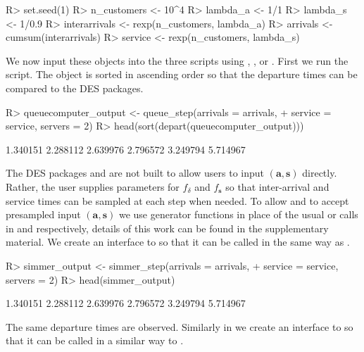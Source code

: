 \documentclass[article]{jss}
\begin{document}
\begin{Code}
R> set.seed(1)
R> n_customers <- 10^4
R> lambda_a <- 1/1
R> lambda_s <- 1/0.9
R> interarrivals <- rexp(n_customers, lambda_a)
R> arrivals <- cumsum(interarrivals)
R> service <- rexp(n_customers, lambda_s)
\end{Code}

We now input these objects into the three scripts using , , or . First we run the  script. The  object is sorted in ascending order so that the departure times can be compared to the DES packages.

\begin{CodeChunk}
\begin{CodeInput}
R> queuecomputer_output <- queue_step(arrivals = arrivals, 
+    service = service, servers = 2)
R> head(sort(depart(queuecomputer_output)))
\end{CodeInput}
\begin{CodeOutput}
[1] 1.340151 2.288112 2.639976 2.796572 3.249794 5.714967
\end{CodeOutput}
\end{CodeChunk}

The DES packages  and  are not built to allow users to input $(\mathbf{a,s})$ directly. Rather, the user supplies parameters for $f_{\delta}$ and $f_{\mathbf{s}}$ so that inter-arrival and service times can be sampled at each step when needed. To allow  and  to accept presampled input $(\mathbf{a,s})$ we use generator functions in place of the usual  or  calls in  and  respectively, details of this work can be found in the supplementary material. We create an interface to  so that it can be called in the same way as . 

\begin{CodeChunk}
\begin{CodeInput}
R> simmer_output <- simmer_step(arrivals = arrivals, 
+    service = service, servers = 2)
R> head(simmer_output)
\end{CodeInput}
\begin{CodeOutput}
[1] 1.340151 2.288112 2.639976 2.796572 3.249794 5.714967
\end{CodeOutput}
\end{CodeChunk}

The same departure times are observed. Similarly in  we create an interface to  so that it can be called in a similar way to . 
\end{document}

